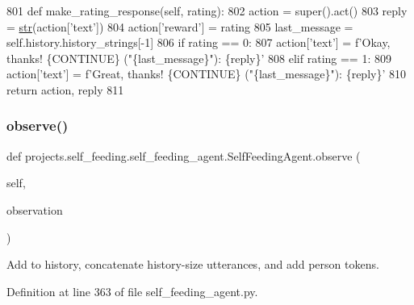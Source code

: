 \begin{DoxyCode}
801     \textcolor{keyword}{def }make\_rating\_response(self, rating):
802         action = super().act()
803         reply = \hyperlink{namespacegenerate__task__READMEs_a5b88452ffb87b78c8c85ececebafc09f}{str}(action[\textcolor{stringliteral}{'text'}])
804         action[\textcolor{stringliteral}{'reward'}] = rating
805         last\_message = self.history.history\_strings[-1]
806         \textcolor{keywordflow}{if} rating == 0:
807             action[\textcolor{stringliteral}{'text'}] = f\textcolor{stringliteral}{'Okay, thanks! \{CONTINUE\} ("\{last\_message\}"): \{reply\}'}
808         \textcolor{keywordflow}{elif} rating == 1:
809             action[\textcolor{stringliteral}{'text'}] = f\textcolor{stringliteral}{'Great, thanks! \{CONTINUE\} ("\{last\_message\}"): \{reply\}'}
810         \textcolor{keywordflow}{return} action, reply
811 
\end{DoxyCode}
\mbox{\label{classprojects_1_1self__feeding_1_1self__feeding__agent_1_1SelfFeedingAgent_a083d8cde4e9351b2f41c52a6205fe92b}} 
\subsubsection{\texorpdfstring{observe()}{observe()}}
{\footnotesize\ttfamily def projects.\+self\+\_\+feeding.\+self\+\_\+feeding\+\_\+agent.\+Self\+Feeding\+Agent.\+observe (\begin{DoxyParamCaption}\item[{}]{self,  }\item[{}]{observation }\end{DoxyParamCaption})}

\begin{DoxyVerb}Add to history, concatenate history-size utterances, and add person tokens.
\end{DoxyVerb}
 

Definition at line 363 of file self\+\_\+feeding\+\_\+agent.\+py.


